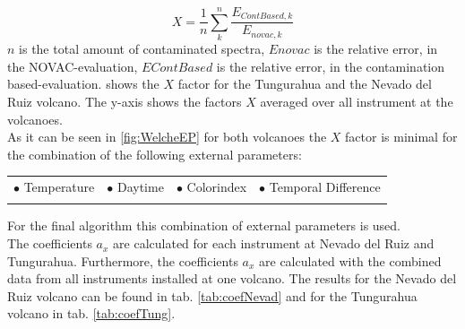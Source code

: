 \documentclass  [
  paper    = a4,
  BCOR     = 10mm,
  twoside,
  fontsize = 12pt,
  fleqn,
  toc      = bibnumbered,
  toc      = listofnumbered,
  numbers  = noendperiod,
  headings = normal,
  listof   = leveldown,
  version  = 3.03
]                                       {scrreprt}
\begin{document}
	\begin{equation}
	X = \frac{1}{n}\sum_{k}^{n} \frac{E_{ContBased, k}}{E_{novac,k}}
	\label{eq:mean}
	\end{equation}
	$n$ is the total amount of contaminated spectra, $Enovac$ is the relative   error, in the NOVAC-evaluation, $EContBased$ is the relative   error, in the contamination based-evaluation. 
	 shows the $X$ factor for the Tungurahua and the Nevado del Ruiz volcano. The y-axis shows the factors $X$ averaged over all instrument at the volcanoes.\\
	As it can be seen in \cref{fig:WelcheEP}  for both volcanoes the $X$ factor is minimal for the combination of the following external parameters:\\
	\begin{table}[h!]
			\begin{tabular}{cccc}
		$\bullet$ Temperature & $\bullet$ Daytime&  $\bullet$ Colorindex & $\bullet$ Temporal Difference\\
		\label{tab:importantexternalParam}
		\end{tabular}
	\end{table}
%	
	For the final algorithm this combination of external parameters is used.\\	
	The coefficients $a_{x}$ are calculated for each instrument at Nevado del Ruiz and Tungurahua. Furthermore, the coefficients $a_{x}$ are calculated with the combined data from all instruments installed at one volcano. The results for the Nevado del Ruiz volcano can be found in tab. \ref{tab:coefNevad} and for the Tungurahua volcano in tab. \ref{tab:coefTung}.\\
	\\
%	
\end{document}
